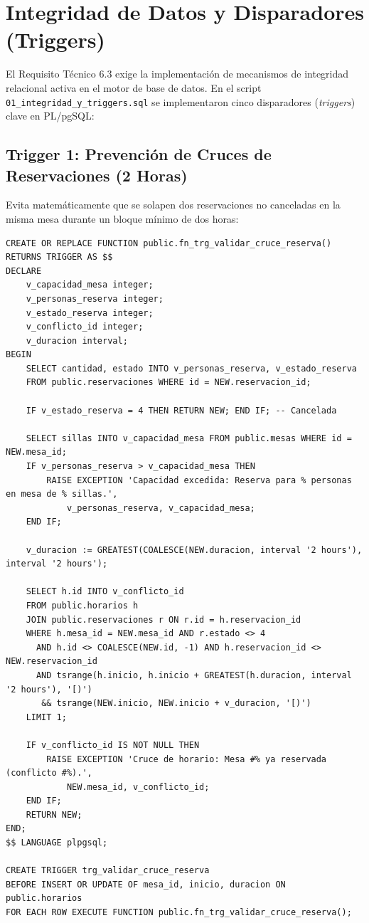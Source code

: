 \documentclass[11pt,letterpaper]{article}
\begin{document}
\newpage
\section{Integridad de Datos y Disparadores (Triggers)}

El Requisito Técnico 6.3 exige la implementación de mecanismos de integridad relacional activa en el motor de base de datos. En el script \texttt{01\_integridad\_y\_triggers.sql} se implementaron cinco disparadores (\textit{triggers}) clave en PL/pgSQL:

\subsection{Trigger 1: Prevención de Cruces de Reservaciones (2 Horas)}
Evita matemáticamente que se solapen dos reservaciones no canceladas en la misma mesa durante un bloque mínimo de dos horas:
\begin{lstlisting}[style=sqlstyle]
CREATE OR REPLACE FUNCTION public.fn_trg_validar_cruce_reserva()
RETURNS TRIGGER AS $$
DECLARE
    v_capacidad_mesa integer;
    v_personas_reserva integer;
    v_estado_reserva integer;
    v_conflicto_id integer;
    v_duracion interval;
BEGIN
    SELECT cantidad, estado INTO v_personas_reserva, v_estado_reserva
    FROM public.reservaciones WHERE id = NEW.reservacion_id;

    IF v_estado_reserva = 4 THEN RETURN NEW; END IF; -- Cancelada

    SELECT sillas INTO v_capacidad_mesa FROM public.mesas WHERE id = NEW.mesa_id;
    IF v_personas_reserva > v_capacidad_mesa THEN
        RAISE EXCEPTION 'Capacidad excedida: Reserva para % personas en mesa de % sillas.',
            v_personas_reserva, v_capacidad_mesa;
    END IF;

    v_duracion := GREATEST(COALESCE(NEW.duracion, interval '2 hours'), interval '2 hours');

    SELECT h.id INTO v_conflicto_id
    FROM public.horarios h
    JOIN public.reservaciones r ON r.id = h.reservacion_id
    WHERE h.mesa_id = NEW.mesa_id AND r.estado <> 4
      AND h.id <> COALESCE(NEW.id, -1) AND h.reservacion_id <> NEW.reservacion_id
      AND tsrange(h.inicio, h.inicio + GREATEST(h.duracion, interval '2 hours'), '[)')
       && tsrange(NEW.inicio, NEW.inicio + v_duracion, '[)')
    LIMIT 1;

    IF v_conflicto_id IS NOT NULL THEN
        RAISE EXCEPTION 'Cruce de horario: Mesa #% ya reservada (conflicto #%).',
            NEW.mesa_id, v_conflicto_id;
    END IF;
    RETURN NEW;
END;
$$ LANGUAGE plpgsql;

CREATE TRIGGER trg_validar_cruce_reserva
BEFORE INSERT OR UPDATE OF mesa_id, inicio, duracion ON public.horarios
FOR EACH ROW EXECUTE FUNCTION public.fn_trg_validar_cruce_reserva();
\end{lstlisting}
\end{document}
